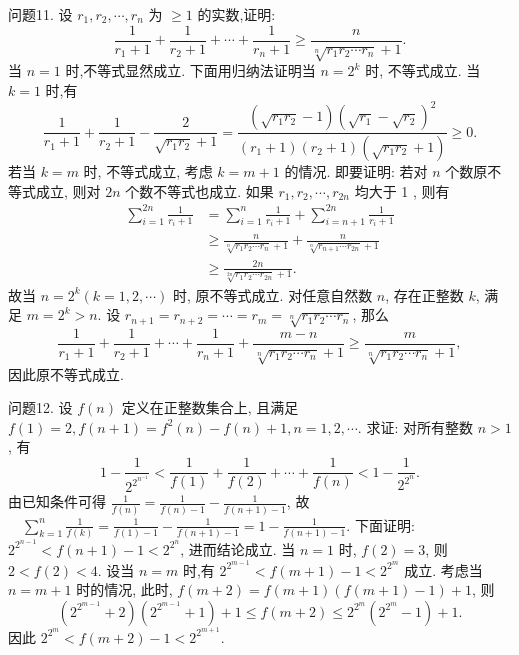 问题11. 设 $r_1, r_2, \cdots, r_n$ 为 $\geqslant 1$ 的实数,证明:
$$
\frac{1}{r_1+1}+\frac{1}{r_2+1}+\cdots+\frac{1}{r_n+1} \geqslant \frac{n}{\sqrt[n]{r_1 r_2 \cdots r_n}+1} .
$$
当 $n=1$ 时,不等式显然成立.
下面用归纳法证明当 $n=2^k$ 时, 不等式成立.
当 $k=1$ 时,有
$$
\frac{1}{r_1+1}+\frac{1}{r_2+1}-\frac{2}{\sqrt{r_1 r_2}+1}=\frac{\left(\sqrt{r_1 r_2}-1\right)\left(\sqrt{r_1}-\sqrt{r_2}\right)^2}{\left(r_1+1\right)\left(r_2+1\right)\left(\sqrt{r_1 r_2}+1\right)} \geqslant 0 .
$$
若当 $k=m$ 时, 不等式成立, 考虑 $k=m+1$ 的情况.
即要证明:
若对 $n$ 个数原不等式成立, 则对 $2 n$ 个数不等式也成立.
如果 $r_1, r_2, \cdots, r_{2 n}$ 均大于 1 , 则有
$$
\begin{aligned}
\sum_{i=1}^{2 n} \frac{1}{r_i+1} & =\sum_{i=1}^n \frac{1}{r_i+1}+\sum_{i=n+1}^{2 n} \frac{1}{r_i+1} \\
& \geqslant \frac{n}{\sqrt[n]{r_1 r_2 \cdots r_n}+1}+\frac{n}{\sqrt[n]{r_{n+1} \cdots r_{2 n}}+1} \\
& \geqslant \frac{2 n}{\sqrt[2 n]{r_1 r_2 \cdots r_{2 n}}+1} .
\end{aligned}
$$
故当 $n=2^k(k=1,2, \cdots)$ 时, 原不等式成立.
对任意自然数 $n$, 存在正整数 $k$, 满足 $m=2^k>n$.
设 $r_{n+1}=r_{n+2}=\cdots=r_m=\sqrt[n]{r_1 r_2 \cdots r_n}$, 那么
$$
\frac{1}{r_1+1}+\frac{1}{r_2+1}+\cdots+\frac{1}{r_n+1}+\frac{m-n}{\sqrt[n]{r_1 r_2 \cdots r_n}+1} \geqslant \frac{m}{\sqrt[n]{r_1 r_2 \cdots r_n}+1},
$$
因此原不等式成立.



问题12. 设 $f(n)$ 定义在正整数集合上, 且满足 $f(1)=2, f(n+1)=f^2(n)- f(n)+1, n=1,2, \cdots$. 求证: 对所有整数 $n>1$, 有
$$
1-\frac{1}{2^{2^{n^{-1}}}}<\frac{1}{f(1)}+\frac{1}{f(2)}+\cdots+\frac{1}{f(n)}<1-\frac{1}{2^{2^n}} .
$$
由已知条件可得 $\frac{1}{f(n)}=\frac{1}{f(n)-1}-\frac{1}{f(n+1)-1}$,
故 $\quad \sum_{k=1}^n \frac{1}{f(k)}=\frac{1}{f(1)-1}-\frac{1}{f(n+1)-1}=1-\frac{1}{f(n+1)-1}$.
下面证明: $2^{2^{n-1}}<f(n+1)-1<2^{2^n}$, 进而结论成立.
当 $n=1$ 时, $f(2)=3$, 则 $2<f(2)<4$.
设当 $n=m$ 时,有 $2^{2^{m-1}}<f(m+1)-1<2^{2^m}$ 成立.
考虑当 $n=m+1$ 时的情况, 此时, $f(m+2)=f(m+1)(f(m+1)-1)+1$, 则
$$
\left(2^{2^{m-1}}+2\right)\left(2^{2^{m-1}}+1\right)+1 \leqslant f(m+2) \leqslant 2^{2^m}\left(2^{2^m}-1\right)+1 .
$$
因此 $2^{2^m}<f(m+2)-1<2^{2^{m+1}}$.



